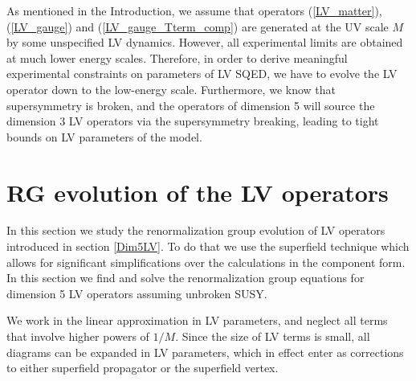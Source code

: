 \documentclass[paper,12pt]{revtex4}
\begin{document}
	As mentioned in the Introduction, we assume that 
    operators (\ref{LV_matter}), (\ref{LV_gauge}) and (\ref{LV_gauge_Tterm_comp}) 
are generated at the UV scale $M$ by some unspecified LV dynamics.
However, all experimental limits are obtained at much lower energy scales. 
Therefore, in order to derive meaningful experimental constraints 
on parameters of LV SQED, we have to evolve the LV operator
down to the low-energy scale. Furthermore, we know that supersymmetry is broken, 
and the operators of dimension 5 will source  the
dimension 3 LV operators via the supersymmetry breaking, leading to tight bounds 
on LV parameters of the model.
	

\section{RG evolution of the LV operators}
\label{RGEvolution}
	In this section we study the renormalization group evolution 
    of LV operators introduced in section \ref{Dim5LV}. To do that 
    we use the superfield technique which allows for significant simplifications 
   over the calculations in the component form. 
    In this section we find and solve the renormalization group equations 
    for dimension 5 LV operators assuming unbroken SUSY.

We work in the linear approximation in LV parameters, and neglect all terms that 
involve higher powers of $1/M$. Since the size of LV terms is small, all diagrams can
be expanded in LV parameters, which in effect enter as corrections to either 
superfield propagator or the superfield vertex. 
\end{document}
